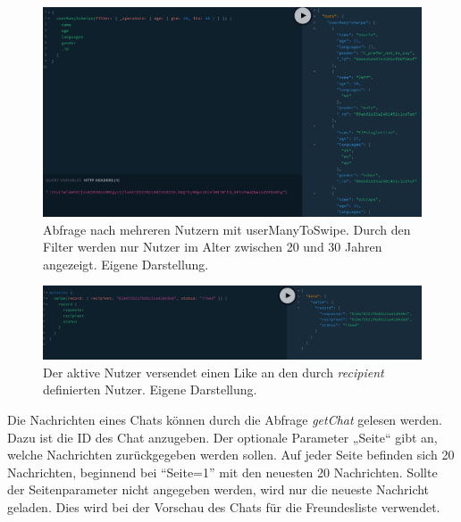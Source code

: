 \begin{figure}
	\centering
    \includegraphics[width=\textwidth]{sources/graphiql_userManyToSwipe.png}
	\caption{Abfrage nach mehreren Nutzern mit userManyToSwipe. Durch den Filter werden nur Nutzer im Alter zwischen 20 und 30 Jahren angezeigt. Eigene Darstellung.}
	\label{fig:gql:5}
\end{figure}

\begin{figure}
	\centering
    \includegraphics[width=\textwidth]{sources/graphiql_swipe.png}
	\caption{Der aktive Nutzer versendet einen Like an den durch \textit{recipient} definierten Nutzer. Eigene Darstellung.}
	\label{fig:gql:6}
\end{figure}

Die Nachrichten eines Chats können durch die Abfrage \textit{getChat} gelesen werden.
Dazu ist die ID des Chat anzugeben.
Der optionale Parameter „Seite“ gibt an, welche Nachrichten zurückgegeben werden sollen.
Auf jeder Seite befinden sich 20 Nachrichten, beginnend bei \enquote{Seite=1} mit den neuesten 20 Nachrichten.
Sollte der Seitenparameter nicht angegeben werden, wird nur die neueste Nachricht geladen.
Dies wird bei der Vorschau des Chats für die Freundesliste verwendet.


